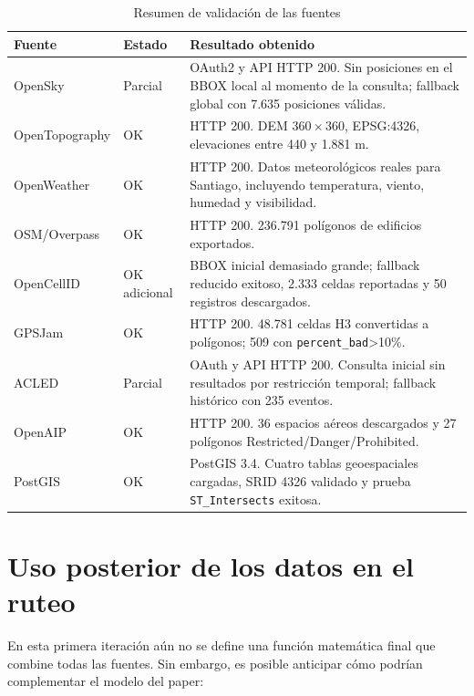 \documentclass[journal,10pt]{IEEEtran}
\begin{document}
\begin{table}[!t]
\centering
\caption{Resumen de validación de las fuentes}
\label{tab:validacion}
\begin{tabular}{|p{2.3cm}|p{1.4cm}|p{12.4cm}|}
\hline
\textbf{Fuente} & \textbf{Estado} & \textbf{Resultado obtenido} \\ \hline
OpenSky & Parcial &
OAuth2 y API HTTP 200. Sin posiciones en el BBOX local al momento de la consulta; fallback global con 7.635 posiciones válidas. \\ \hline
OpenTopography & OK &
HTTP 200. DEM $360\times360$, EPSG:4326, elevaciones entre 440 y 1.881 m. \\ \hline
OpenWeather & OK &
HTTP 200. Datos meteorológicos reales para Santiago, incluyendo temperatura, viento, humedad y visibilidad. \\ \hline
OSM/Overpass & OK &
HTTP 200. 236.791 polígonos de edificios exportados. \\ \hline
OpenCellID & OK adicional &
BBOX inicial demasiado grande; fallback reducido exitoso, 2.333 celdas reportadas y 50 registros descargados. \\ \hline
GPSJam & OK &
HTTP 200. 48.781 celdas H3 convertidas a polígonos; 509 con \texttt{percent\_bad}>10\%. \\ \hline
ACLED & Parcial &
OAuth y API HTTP 200. Consulta inicial sin resultados por restricción temporal; fallback histórico con 235 eventos. \\ \hline
OpenAIP & OK &
HTTP 200. 36 espacios aéreos descargados y 27 polígonos Restricted/Danger/Prohibited. \\ \hline
PostGIS & OK &
PostGIS 3.4. Cuatro tablas geoespaciales cargadas, SRID 4326 validado y prueba \texttt{ST\_Intersects} exitosa. \\ \hline
\end{tabular}
\end{table}



\section{Uso posterior de los datos en el ruteo}

En esta primera iteración aún no se define una función matemática final que combine todas las
fuentes. Sin embargo, es posible anticipar cómo podrían complementar el modelo del paper:
\end{document}
